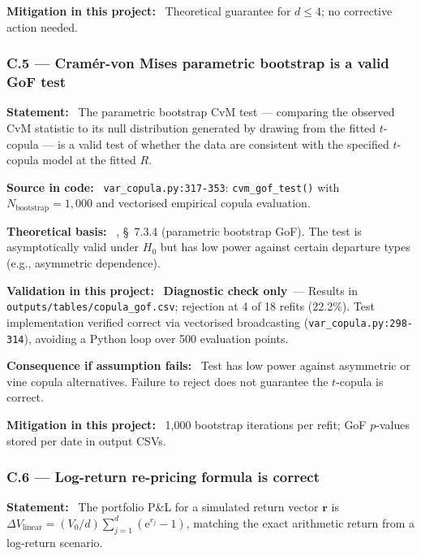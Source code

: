 \documentclass[11pt,a4paper]{article}
\newcommand{\asmfield}[1]{\medskip\noindent\textbf{#1:}\ }
\newcommand{\code}[1]{\texttt{#1}}
\newcommand{\diagnostic}{\textbf{Diagnostic check only}}
\begin{document}
\asmfield{Mitigation in this project}
Theoretical guarantee for $d \le 4$; no corrective action needed.

\subsubsection{C.5 --- Cram\'er-von Mises parametric bootstrap is a valid GoF test}\label{asm:C5}

\asmfield{Statement}
The parametric bootstrap CvM test --- comparing the observed CvM statistic
to its null distribution generated by drawing from the fitted $t$-copula ---
is a valid test of whether the data are consistent with the specified
$t$-copula model at the fitted $R$.

\asmfield{Source in code}
\code{var\_copula.py:317-353}: \code{cvm\_gof\_test()} with
$N_{\mathrm{bootstrap}} = 1{,}000$ and vectorised empirical copula evaluation.

\asmfield{Theoretical basis}
\cite{McNeilFreyEmbrechts2005}, \S~7.3.4 (parametric bootstrap GoF).
The test is asymptotically valid under $H_0$ but has low power against
certain departure types (e.g., asymmetric dependence).

\asmfield{Validation in this project}
\diagnostic\ --- Results in \code{outputs/tables/copula\_gof.csv};
rejection at 4 of 18 refits (22.2\%). Test implementation verified correct
via vectorised broadcasting (\code{var\_copula.py:298-314}), avoiding a
Python loop over 500 evaluation points.

\asmfield{Consequence if assumption fails}
Test has low power against asymmetric or vine copula alternatives. Failure
to reject does not guarantee the $t$-copula is correct.

\asmfield{Mitigation in this project}
1{,}000 bootstrap iterations per refit; GoF $p$-values stored per date
in output CSVs.

\subsubsection{C.6 --- Log-return re-pricing formula is correct}\label{asm:C6}

\asmfield{Statement}
The portfolio P\&L for a simulated return vector $\mathbf{r}$ is
$\Delta V_{\text{linear}} = (V_0/d) \sum_{j=1}^{d}(\mathrm{e}^{r_j} - 1)$,
matching the exact arithmetic return from a log-return scenario.
\end{document}
